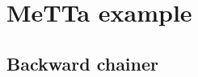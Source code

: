 \documentclass[aspectratio=169]{beamer}
\begin{document}





\section{MeTTa example}

\subsection{Backward chainer}






\end{document}
